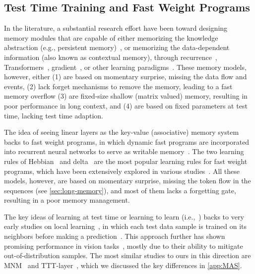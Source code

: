 \subsection{Test Time Training and Fast Weight Programs}


In the literature, a substantial research effort have been toward designing memory modules that are capable of either memorizing the knowledge abstraction (e.g., persistent memory)~\citep{sukhbaatar2019augmenting}, or memorizing the data-dependent information (also known as contextual memory), through recurrence~\citep{zancato2024bmojo, bulatov2022recurrent, rodkin2024associative}, Transformers~\citep{munkhdalai2024leave, zhang2024memory, cetin2024evolved, berges2024memory, le2020self, feng2022learn}, gradient~\citep{munkhdalai2019metalearned, irie2022dual}, or other learning paradigms~\citep{weston2014memory, sukhbaatar2015end}. These memory models, however, either (1) are based on momentary surprise, missing the data flow and events,   (2) lack forget mechanisms to remove the memory, leading to a fast memory overflow (3) are fixed-size shallow (matrix valued) memory, resulting in poor performance in long context, and (4) are based on fixed parameters at test time, lacking test time adaption. 

The idea of seeing linear layers as the key-value (associative) memory system backs to fast weight programs, in which dynamic fast programs are incorporated into recurrent neural networks to serve as writable memory~\citep{schlag2021linear, schmidhuber1992learning, schmidhuber1993reducing}. The two learning rules of Hebbian~\citep{hebb2005organization} and delta~\citep{prados1989neural} are the most popular learning rules for fast weight programs, which have been extensively explored in various studies~\citep{munkhdalai2017neural, schmidhuber1992learning, munkhdalai2019metalearned, schlag2021linear, irie2021going, yang2024parallelizing, yang2024gated}. All these models, however, are based on momentary surprise, missing the token flow in the sequences (see \autoref{sec:long-memory}), and most of them lacks a forgetting gate, resulting in a poor memory management. 



The key ideas of learning at test time or learning to learn (i.e.,~\citep{andrychowicz2016learning}) backs to very early studies on local learning~\cite{bottou1992local}, in which each test data sample is trained on its neighbors before making a prediction~\citep{zhang2006svm, gandelsman2022test}. This approach further has shown promising performance in vision tasks~\citep{jain2011online, mullapudi2019online}, mostly due to their ability to mitigate out-of-distribution samples. The most similar studies to ours in this direction are MNM~\citep{munkhdalai2019metalearned} and TTT-layer~\citep{sun2024learning}, which we discussed the key differences in \autoref{app:MAS}. 
